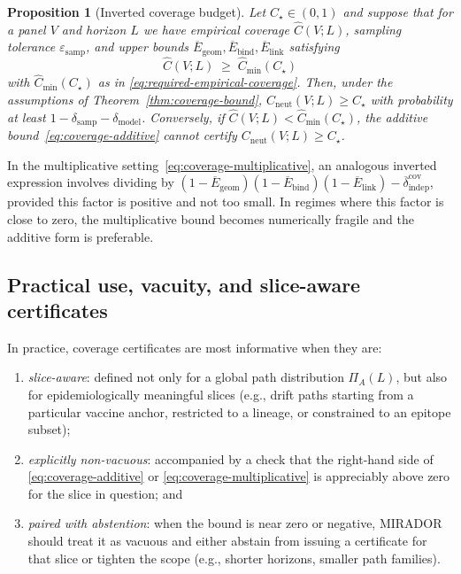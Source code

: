 \documentclass[11pt]{article}
\newtheorem{proposition}{Proposition}
\begin{document}
\begin{proposition}[Inverted coverage budget]
\label{prop:inverted-budget}
Let $C_\star \in (0,1)$ and suppose that for a panel $V$ and horizon $L$ we have empirical
coverage $\widehat{C}(V;L)$, sampling tolerance $\varepsilon_{\mathrm{samp}}$, and upper bounds
$\overline{E}_{\mathrm{geom}}, \overline{E}_{\mathrm{bind}}, \overline{E}_{\mathrm{link}}$ satisfying
\[
\widehat{C}(V;L)
\;\ge\;
\widehat{C}_{\min}(C_\star)
\]
with $\widehat{C}_{\min}(C_\star)$ as in \eqref{eq:required-empirical-coverage}. Then, under the
assumptions of Theorem~\ref{thm:coverage-bound}, $C_{\mathrm{neut}}(V;L) \ge C_\star$ with
probability at least $1-\delta_{\mathrm{samp}}-\delta_{\mathrm{model}}$. Conversely, if
$\widehat{C}(V;L) < \widehat{C}_{\min}(C_\star)$, the additive bound~\eqref{eq:coverage-additive}
cannot certify $C_{\mathrm{neut}}(V;L) \ge C_\star$.
\end{proposition}

In the multiplicative setting~\eqref{eq:coverage-multiplicative}, an analogous inverted expression
involves dividing by
$(1 - \overline{E}_{\mathrm{geom}})(1 - \overline{E}_{\mathrm{bind}})(1 - \overline{E}_{\mathrm{link}})
- \overline{\delta}_{\mathrm{indep}}^{\mathrm{cov}}$, provided this factor is positive and not too
small. In regimes where this factor is close to zero, the multiplicative bound becomes numerically
fragile and the additive form is preferable.

\subsection{Practical use, vacuity, and slice-aware certificates}

In practice, coverage certificates are most informative when they are:
\begin{enumerate}
\item \emph{slice-aware}: defined not only for a global path distribution $\Pi_A(L)$, but also
for epidemiologically meaningful slices (e.g., drift paths starting from a particular vaccine
anchor, restricted to a lineage, or constrained to an epitope subset);

\item \emph{explicitly non-vacuous}: accompanied by a check that the right-hand side of
\eqref{eq:coverage-additive} or \eqref{eq:coverage-multiplicative} is appreciably above zero
for the slice in question; and

\item \emph{paired with abstention}: when the bound is near zero or negative, MIRADOR should
treat it as vacuous and either abstain from issuing a certificate for that slice or tighten the
scope (e.g., shorter horizons, smaller path families).
\end{enumerate}
\end{document}
